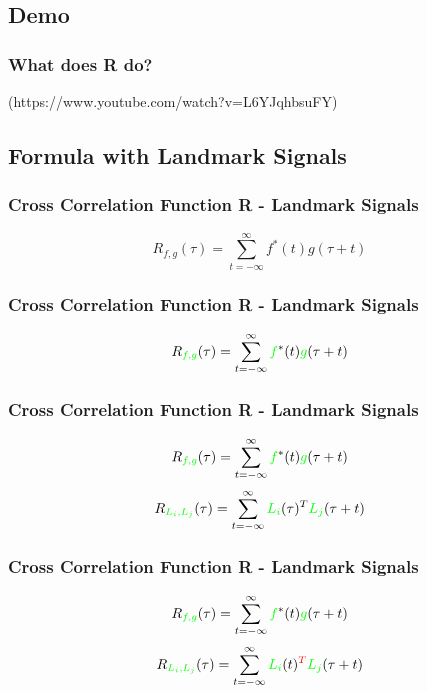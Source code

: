 \documentclass{beamer}
\begin{document}
\subsection{Demo}
\begin{frame}
\frametitle{What does R do?}
\begin{center}
\end{center}
(https://www.youtube.com/watch?v=L6YJqhbsuFY) 
\end{frame}


\subsection{Formula with Landmark Signals}
\begin{frame}
\frametitle{Cross Correlation Function R - Landmark Signals}
\begin{displaymath}
R_{f,g}(\tau)= \sum_{ t = -\infty}^{\infty}  f^*(t) g(\tau +t) %
\end{displaymath}
\end{frame}


\begin{frame}
\frametitle{Cross Correlation Function R - Landmark Signals}
\begin{displaymath}
R_{  \textcolor{green}{f,g}   }(\tau)= \sum_{ t = -\infty}^{\infty}  \textcolor{green}{f}^*(t) \textcolor{green}{g}(\tau +t)
\end{displaymath}
\end{frame}



\begin{frame}
\frametitle{Cross Correlation Function R - Landmark Signals}
\begin{displaymath}
R_{  \textcolor{green}{f,g}   }(\tau)= \sum_{ t = -\infty}^{\infty}  \textcolor{green}{f}^*(t) \textcolor{green}{g}(\tau +t)
\end{displaymath}
\begin{displaymath}
R_{  \textcolor{green}{L_i,L_j}  }(\tau)= \sum_{ t = -\infty}^{\infty}  \textcolor{green}{L_i}(\tau)^T \textcolor{green}{L_j}(\tau +t)
\end{displaymath}
\end{frame}



\begin{frame}
\frametitle{Cross Correlation Function R - Landmark Signals}
\begin{displaymath}
R_{  \textcolor{green}{f,g}   }(\tau)= \sum_{ t = -\infty}^{\infty}  \textcolor{green}{f} ^*(t) \textcolor{green}{g}(\tau +t)
\end{displaymath}
\begin{displaymath}
R_{  \textcolor{green}{L_i,L_j}  }(\tau)= \sum_{ t = -\infty}^{\infty}   \textcolor{green}{L_i}(t)\textcolor{red}{^T} \textcolor{green}{L_j}(\tau +t)
\end{displaymath}
\end{frame}
\end{document}
